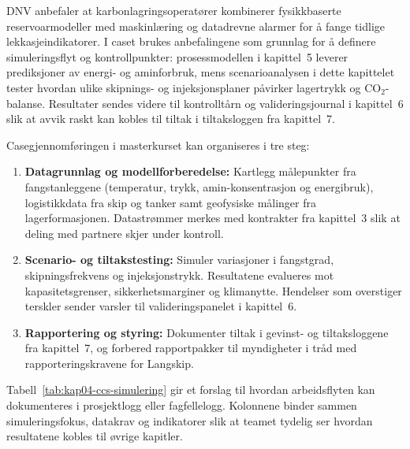DNV anbefaler at karbonlagringsoperatører kombinerer fysikkbaserte reservoarmodeller med maskinlæring og datadrevne alarmer for å fange tidlige lekkasjeindikatorer.\citep{dnv2023ccsmonitoring} I caset brukes anbefalingene som grunnlag for å definere simuleringsflyt og kontrollpunkter: prosessmodellen i kapittel~5 leverer prediksjoner av energi- og aminforbruk, mens scenarioanalysen i dette kapittelet tester hvordan ulike skipnings- og injeksjonsplaner påvirker lagertrykk og CO$_2$-balanse. Resultater sendes videre til kontrolltårn og valideringsjournal i kapittel~6 slik at avvik raskt kan kobles til tiltak i tiltaksloggen fra kapittel~7.

Casegjennomføringen i masterkurset kan organiseres i tre steg:
\begin{enumerate}
    \item \textbf{Datagrunnlag og modellforberedelse:} Kartlegg målepunkter fra fangstanleggene (temperatur, trykk, amin-konsentrasjon og energibruk), logistikkdata fra skip og tanker samt geofysiske målinger fra lagerformasjonen. Datastrømmer merkes med kontrakter fra kapittel~3 slik at deling med partnere skjer under kontroll.
    \item \textbf{Scenario- og tiltakstesting:} Simuler variasjoner i fangstgrad, skipningsfrekvens og injeksjonstrykk. Resultatene evalueres mot kapasitetsgrenser, sikkerhetsmarginer og klimanytte. Hendelser som overstiger terskler sender varsler til valideringspanelet i kapittel~6.
    \item \textbf{Rapportering og styring:} Dokumenter tiltak i gevinst- og tiltaksloggene fra kapittel~7, og forbered rapportpakker til myndigheter i tråd med rapporteringskravene for Langskip.
\end{enumerate}

Tabell~\ref{tab:kap04-ccs-simulering} gir et forslag til hvordan arbeidsflyten kan dokumenteres i prosjektlogg eller fagfellelogg. Kolonnene binder sammen simuleringsfokus, datakrav og indikatorer slik at teamet tydelig ser hvordan resultatene kobles til øvrige kapitler.

